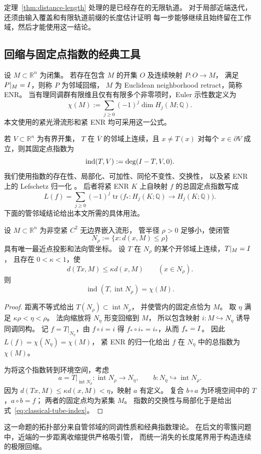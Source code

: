 定理~\ref{thm:distance-length} 处理的是已经存在的无限轨道。
对于局部近端迭代，还须由输入覆盖和有限轨道前缀的长度估计证明
每一步能够继续且始终留在工作域，然后才能使用这一结论。

\subsection{回缩与固定点指数的经典工具}
\label{subsec:classical-topology}

设 $M\subset\mathbb R^n$ 为闭集。
若存在包含 $M$ 的开集 $O$ 及连续映射 $P:O\to M$，
满足 $P|_M=I$，则称 $P$ 为邻域回缩，
$M$ 为 Euclidean neighborhood retract，简称 ENR。
当有理同调群有限维且仅有有限多个非零项时，Euler 示性数定义为
\[
 \chi(M):=\sum_{j\ge0}(-1)^j\dim H_j(M;\mathbb Q).
\]
本文使用的紧光滑流形和紧 ENR 均可采用这一公式。

若 $V\subset\mathbb R^n$ 为有界开集，
$T$ 在 $\overline V$ 的邻域上连续，且
$x\ne T(x)$ 对每个 $x\in\partial V$ 成立，则其固定点指数为
\[
 \operatorname{ind}(T,V):=\deg(I-T,V,0).
\]
我们使用指数的存在性、局部化、可加性、同伦不变性、交换性，
以及紧 ENR 上的 Lefschetz 归一化
\cite[\S2.1]{BenjaminGottliebCollars}。
后者将紧 ENR $K$ 上自映射 $f$ 的总固定点指数写成
\[
 L(f)=\sum_{j\ge0}(-1)^j
 \operatorname{tr}\bigl(f_*:H_j(K;\mathbb Q)\to H_j(K;\mathbb Q)\bigr).
\]
下面的管邻域结论给出本文所需的具体用法。

\begin{classicalproposition}[严格吸引管的指数]
\label{classical:tube-index}
设 $M\subset\mathbb R^n$ 为非空紧 $C^2$ 无边界嵌入流形，
管半径 $\rho>0$ 足够小，使闭管
\[
 N_\rho:=\{x:d(x,M)\le\rho\}
\]
具有唯一最近点投影和法向管坐标。
设 $T$ 在 $N_\rho$ 的某个开邻域上连续，$T|_M=I$，
且存在 $0<\kappa<1$，使
\[
 d(Tx,M)\le\kappa d(x,M)\qquad(x\in N_\rho).
\]
则
\begin{equation}
 \operatorname{ind}(T,\operatorname{int}N_\rho)=\chi(M).
 \label{eq:classical-tube-index}
\end{equation}
\end{classicalproposition}

\begin{proof}
距离不等式给出 $T(N_\rho)\subset\operatorname{int}N_\rho$，
并使管内的固定点恰为 $M$。
取 $\eta$ 满足 $\kappa\rho<\eta<\rho$。
法向缩放将 $N_\eta$ 形变回缩到 $M$，
所以包含映射 $i:M\hookrightarrow N_\eta$ 诱导同调同构。
记 $f=T|_{N_\eta}$，由 $f\circ i=i$ 得
$f_*\circ i_*=i_*$，从而 $f_*=I$。
因此 $L(f)=\chi(N_\eta)=\chi(M)$，
紧 ENR 的归一化给出 $f$ 在 $N_\eta$ 中的总指数为 $\chi(M)$。

为将这个指数转到环境空间，考虑
\[
 a=T|_{\operatorname{int}N_\rho}:
 \operatorname{int}N_\rho\longrightarrow N_\eta,
 \qquad
 b:N_\eta\hookrightarrow\operatorname{int}N_\rho.
\]
因为 $d(Tx,M)\le\kappa d(x,M)<\eta$，映射 $a$ 有定义。
复合 $b\circ a$ 为环境空间中的 $T$，$a\circ b=f$；
两者的固定点均为紧集 $M$。
指数的交换性与局部化于是给出
式~\eqref{eq:classical-tube-index}。
\end{proof}

这一命题的拓扑部分来自管邻域的同调性质和经典指数理论。
在后文的零簇问题中，近端的一步距离收缩提供严格吸引管，
而统一消失的长度尾界用于构造连续的极限回缩。
